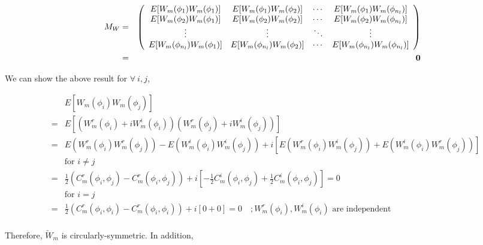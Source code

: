	\begin{eqnarray*}
		M_W & = & \left(\begin{array}{cccc}
		E[W_m(\phi_1) W_m(\phi_1) ] & E[W_m(\phi_1) W_m(\phi_2) ]  & \cdots & E[W_m(\phi_1) W_m(\phi_{n_l}) ]\\
		E[W_m(\phi_2) W_m(\phi_1) ] & E[W_m(\phi_2) W_m(\phi_2) ]  & \cdots & E[W_m(\phi_2) W_m(\phi_{n_l}) ]\\
		\vdots & \vdots  & \ddots & \vdots \\
		E[W_m(\phi_{n_l}) W_m(\phi_1) ] & E[W_m(\phi_{n_l}) W_m(\phi_2) ]  & \cdots & E[W_m(\phi_{n_l}) W_m(\phi_{n_l})]
		\end{array}
		\right)\\
		&=& {\bf 0}
	\end{eqnarray*}
		
	We can show the above result for $\forall\ i,j$,
		
	\begin{eqnarray*}
		& & E[W_m(\phi_i) W_m(\phi_j) ]\\
		&=& E[(W_m^r(\phi_i) + i W_m^i(\phi_i))(W_m^r(\phi_j) + i W_m^i(\phi_j))] \\
		&=& E(W_m^r(\phi_i)W_m^r(\phi_j)) - E(W_m^i(\phi_i)W_m^i(\phi_j)) + i[E(W_m^r(\phi_i)W_m^i(\phi_j)) + E(W_m^i(\phi_i)W_m^r(\phi_j))] \\
		& & \mbox{for $i \ne j$} \\
		&=& \frac{1}{2}(C_m^r(\phi_i, \phi_j) - C_m^r(\phi_i, \phi_j)) + i [-\frac{1}{2} C_m^i(\phi_i, \phi_j) + \frac{1}{2}C_m^i(\phi_i, \phi_j)] = 0 \\
		& & \mbox{for $i = j$} \\
		&=& \frac{1}{2}(C_m^r(\phi_i, \phi_i) - C_m^r(\phi_i, \phi_i)) + i [0 + 0] = 0 \quad ;W_m^r(\phi_i),W_m^i(\phi_i) \text{ are independent}  \\
	\end{eqnarray*}
		
		
	Therefore, $\utilde{W}_m$ is circularly-symmetric. In addition,
		
